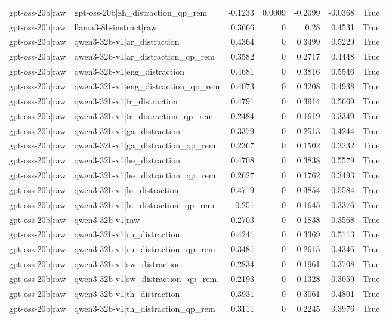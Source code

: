 \begin{table}
\begin{tabular}{l l r r r r l}
gpt-oss-20b|raw & gpt-oss-20b|zh_distraction_qp_rem & -0.1233 & 0.0009 & -0.2099 & -0.0368 & True \\
gpt-oss-20b|raw & llama3-8b-instruct|raw & 0.3666 & 0 & 0.28 & 0.4531 & True \\
gpt-oss-20b|raw & qwen3-32b-v1|ar_distraction & 0.4364 & 0 & 0.3499 & 0.5229 & True \\
gpt-oss-20b|raw & qwen3-32b-v1|ar_distraction_qp_rem & 0.3582 & 0 & 0.2717 & 0.4448 & True \\
gpt-oss-20b|raw & qwen3-32b-v1|eng_distraction & 0.4681 & 0 & 0.3816 & 0.5546 & True \\
gpt-oss-20b|raw & qwen3-32b-v1|eng_distraction_qp_rem & 0.4073 & 0 & 0.3208 & 0.4938 & True \\
gpt-oss-20b|raw & qwen3-32b-v1|fr_distraction & 0.4791 & 0 & 0.3914 & 0.5669 & True \\
gpt-oss-20b|raw & qwen3-32b-v1|fr_distraction_qp_rem & 0.2484 & 0 & 0.1619 & 0.3349 & True \\
gpt-oss-20b|raw & qwen3-32b-v1|ga_distraction & 0.3379 & 0 & 0.2513 & 0.4244 & True \\
gpt-oss-20b|raw & qwen3-32b-v1|ga_distraction_qp_rem & 0.2367 & 0 & 0.1502 & 0.3232 & True \\
gpt-oss-20b|raw & qwen3-32b-v1|he_distraction & 0.4708 & 0 & 0.3838 & 0.5579 & True \\
gpt-oss-20b|raw & qwen3-32b-v1|he_distraction_qp_rem & 0.2627 & 0 & 0.1762 & 0.3493 & True \\
gpt-oss-20b|raw & qwen3-32b-v1|hi_distraction & 0.4719 & 0 & 0.3854 & 0.5584 & True \\
gpt-oss-20b|raw & qwen3-32b-v1|hi_distraction_qp_rem & 0.251 & 0 & 0.1645 & 0.3376 & True \\
gpt-oss-20b|raw & qwen3-32b-v1|raw & 0.2703 & 0 & 0.1838 & 0.3568 & True \\
gpt-oss-20b|raw & qwen3-32b-v1|ru_distraction & 0.4241 & 0 & 0.3369 & 0.5113 & True \\
gpt-oss-20b|raw & qwen3-32b-v1|ru_distraction_qp_rem & 0.3481 & 0 & 0.2615 & 0.4346 & True \\
gpt-oss-20b|raw & qwen3-32b-v1|sw_distraction & 0.2834 & 0 & 0.1961 & 0.3708 & True \\
gpt-oss-20b|raw & qwen3-32b-v1|sw_distraction_qp_rem & 0.2193 & 0 & 0.1328 & 0.3059 & True \\
gpt-oss-20b|raw & qwen3-32b-v1|th_distraction & 0.3931 & 0 & 0.3061 & 0.4801 & True \\
gpt-oss-20b|raw & qwen3-32b-v1|th_distraction_qp_rem & 0.3111 & 0 & 0.2245 & 0.3976 & True \\

\end{tabular}
\end{table}
